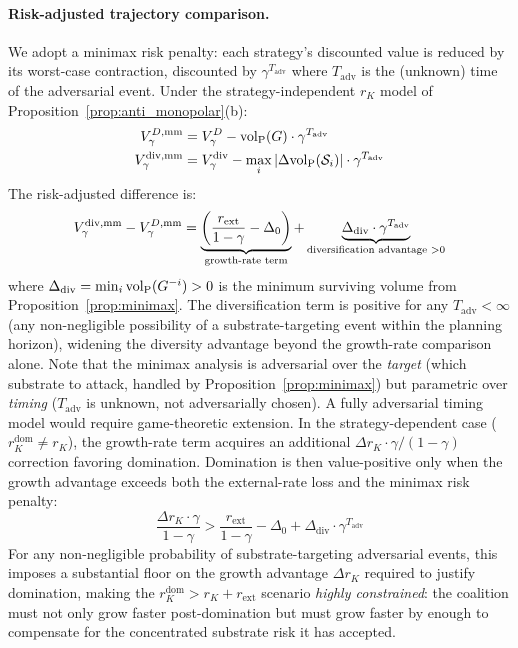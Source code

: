 \paragraph{Risk-adjusted trajectory comparison.} We adopt a minimax risk
penalty: each strategy's discounted value is reduced by its worst-case
contraction, discounted by $\gamma^{T_{\mathrm{adv}}}$ where
$T_{\mathrm{adv}}$ is the (unknown) time of the adversarial event. Under
the strategy-independent $r_K$ model of
Proposition~\ref{prop:anti_monopolar}(b):
\begin{align}
\label{eq:risk_adjusted_domination}
V_\gamma^{D,\mathrm{mm}} &= V_\gamma^D -
    {\operatorname{vol}_{\mathrm{P}}}(G) \cdot \gamma^{T_{\mathrm{adv}}} \\
\label{eq:risk_adjusted_diversity}
V_\gamma^{\mathrm{div},\mathrm{mm}} &= V_\gamma^{\mathrm{div}} -
    \max_i |\Delta {\operatorname{vol}_{\mathrm{P}}}(\mathcal{S}_i)| \cdot
    \gamma^{T_{\mathrm{adv}}}
\end{align}
The risk-adjusted difference is:
\begin{equation}
\label{eq:risk_adjusted_diff}
V_\gamma^{\mathrm{div},\mathrm{mm}} - V_\gamma^{D,\mathrm{mm}}
    = \underbrace{\left(\frac{r_{\mathrm{ext}}}{1 - \gamma} -
    \Delta_0\right)}_{\text{growth-rate term}}
    + \underbrace{\Delta_{\mathrm{div}} \cdot
    \gamma^{T_{\mathrm{adv}}}}_{\text{diversification advantage } > 0}
\end{equation}
where $\Delta_{\mathrm{div}} = \min_i {\operatorname{vol}_{\mathrm{P}}}(G^{-i}) > 0$ is the minimum
surviving volume from Proposition~\ref{prop:minimax}. The diversification
term is positive for any
$T_{\mathrm{adv}} < \infty$ (any non-negligible possibility of a
substrate-targeting event within the planning horizon), widening the
diversity advantage beyond the growth-rate comparison alone. Note that the
minimax analysis is adversarial over the \emph{target} (which substrate to
attack, handled by Proposition~\ref{prop:minimax}) but parametric over
\emph{timing} ($T_{\mathrm{adv}}$ is unknown, not adversarially chosen). A
fully adversarial timing model would require game-theoretic extension. In the strategy-dependent case
($r_K^{\mathrm{dom}} \neq r_K$), the growth-rate term acquires an
additional $\Delta r_K \cdot \gamma / (1 - \gamma)$ correction favoring
domination. Domination is then value-positive only when the growth
advantage exceeds both the external-rate loss and the minimax risk penalty:
\[
\frac{\Delta r_K \cdot \gamma}{1 - \gamma}
    > \frac{r_{\mathrm{ext}}}{1 - \gamma} - \Delta_0
    + \Delta_{\mathrm{div}} \cdot \gamma^{T_{\mathrm{adv}}}
\] For any non-negligible probability of
substrate-targeting adversarial events, this imposes a substantial floor on
the growth advantage $\Delta r_K$ required to justify domination, making
the $r_K^{\mathrm{dom}} > r_K + r_{\mathrm{ext}}$ scenario
\emph{highly constrained}: the coalition must not only grow faster
post-domination but must grow faster by enough to compensate for the
concentrated substrate risk it has accepted.


